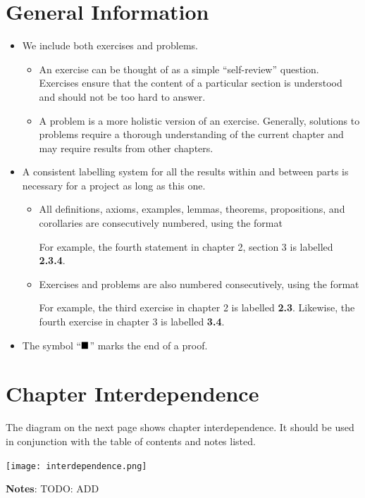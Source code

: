 \section*{General Information}
\begin{itemize}
    \item We include both exercises and problems.
    \begin{itemize}
        \item An exercise can be thought of as a simple ``self-review'' question. Exercises ensure that the content of a particular section is understood and should not be too hard to answer.
        \item A problem is a more holistic version of an exercise. Generally, solutions to problems require a thorough understanding of the current chapter and may require results from other chapters.
    \end{itemize}
    \item A consistent labelling system for all the results within and between parts is necessary for a project as long as this one.
    \begin{itemize}
        \item All definitions, axioms, examples, lemmas, theorems, propositions, and corollaries are consecutively numbered, using the format
        \begin{quote}
        \end{quote}
        For example, the fourth statement in chapter 2, section 3 is labelled \textbf{2.3.4}.
        \item Exercises and problems are also numbered consecutively, using the format
        \begin{quote}
        \end{quote}
        For example, the third exercise in chapter 2 is labelled \textbf{2.3}. Likewise, the fourth exercise in chapter 3 is labelled \textbf{3.4}.
    \end{itemize}
    \item The symbol ``$\blacksquare$'' marks the end of a proof.
\end{itemize}

\section*{Chapter Interdependence}
The diagram on the next page shows chapter interdependence. It should be used in conjunction with the table of contents and notes listed.

\newpage
\texttt{[image: interdependence.png]}

\newpage

\textbf{Notes}:
TODO: ADD
